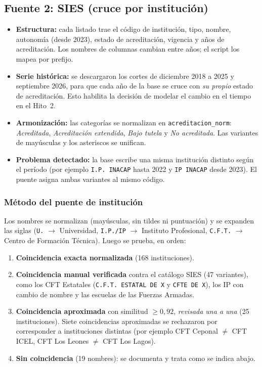 \documentclass[11pt,a4paper]{article}
\begin{document}
\subsection{Fuente 2: SIES (cruce por instituci\'on)}
\begin{itemize}
    \item \textbf{Estructura:} cada listado trae el c\'odigo de instituci\'on, tipo, nombre, autonom\'ia (desde 2023), estado de acreditaci\'on, vigencia y a\~nos de acreditaci\'on. Los nombres de columnas cambian entre a\~nos; el script los mapea por prefijo.
    \item \textbf{Serie hist\'orica:} se descargaron los cortes de diciembre 2018 a 2025 y septiembre 2026, para que cada a\~no de la base se cruce con \emph{su propio} estado de acreditaci\'on. Esto habilita la decisi\'on de modelar el cambio en el tiempo en el Hito~2.
    \item \textbf{Armonizaci\'on:} las categor\'ias se normalizan en \texttt{acreditacion\_norm}: \emph{Acreditada}, \emph{Acreditaci\'on extendida}, \emph{Bajo tutela} y \emph{No acreditada}. Las variantes de may\'usculas y los asteriscos se unifican.
    \item \textbf{Problema detectado:} la base escribe una misma instituci\'on distinto seg\'un el per\'iodo (por ejemplo \texttt{I.P. INACAP} hasta 2022 y \texttt{IP INACAP} desde 2023). El puente asigna ambas variantes al mismo c\'odigo.
\end{itemize}

\subsubsection{M\'etodo del puente de instituci\'on}
Los nombres se normalizan (may\'usculas, sin tildes ni puntuaci\'on) y se expanden las siglas (\texttt{U.} $\rightarrow$ Universidad, \texttt{I.P./IP} $\rightarrow$ Instituto Profesional, \texttt{C.F.T.} $\rightarrow$ Centro de Formaci\'on T\'ecnica). Luego se prueba, en orden:
\begin{enumerate}
    \item \textbf{Coincidencia exacta normalizada} (168 instituciones).
    \item \textbf{Coincidencia manual verificada} contra el cat\'alogo SIES (47 variantes), como los CFT Estatales (\texttt{C.F.T. ESTATAL DE X} y \texttt{CFTE DE X}), los IP con cambio de nombre y las escuelas de las Fuerzas Armadas.
    \item \textbf{Coincidencia aproximada} con similitud $\geq 0{,}92$, \emph{revisada una a una} (25 instituciones). Siete coincidencias aproximadas se rechazaron por corresponder a instituciones distintas (por ejemplo CFT Ceponal $\neq$ CFT ICEL, CFT Los Leones $\neq$ CFT Los Lagos).
    \item \textbf{Sin coincidencia} (19 nombres): se documenta y trata como se indica abajo.
\end{enumerate}
\end{document}
